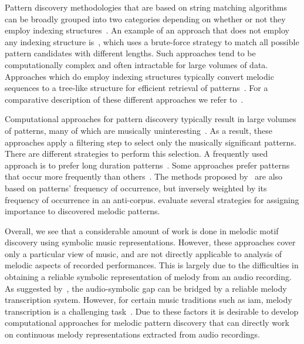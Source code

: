 Pattern discovery methodologies that are based on string matching algorithms can be broadly grouped into two categories depending on whether or not they employ indexing structures~\citep{Janssen2013}. An example of an approach that does not employ any indexing structure is~\cite{nieto2012perceptual}, which uses a brute-force strategy to match all possible pattern candidates with different lengths. Such approaches tend to be computationally complex and often intractable for large volumes of data. Approaches which do employ indexing structures typically convert melodic sequences to a tree-like structure for efficient retrieval of patterns~\citep{Knopke2009,conklin2011comparative}. For a comparative description of these different approaches we refer to~\cite{Janssen2013,meredith2002algorithms}.

Computational approaches for pattern discovery typically result in large volumes of patterns, many of which are musically uninteresting~\citep{marsden2012counselling,conklin2010discovery}. As a result, these approaches apply a filtering step to select only the musically significant patterns. There are different strategies to perform this selection. A frequently used approach is to prefer long duration patterns~\citep{Cambouropoulos2006,Karydis2006}. Some approaches prefer patterns that occur more frequently than others~\citep{Cambouropoulos2006,meredith2002algorithms}. The methods proposed by~\cite{conklin2010discovery,conklin2011comparative} are also based on patterns' frequency of occurrence, but inversely weighted by its frequency of occurrence in an anti-corpus. \cite{collins2011modeling} evaluate several strategies for assigning importance to discovered melodic patterns.

Overall, we see that a considerable amount of work is done in melodic motif discovery using symbolic music representations. However, these approaches cover only a particular view of music, and are not directly applicable to analysis of melodic aspects of recorded performances. This is largely due to the difficulties in obtaining a reliable symbolic representation of melody from an audio recording. As suggested by~\cite{collins2014bridging}, the audio-symbolic gap can be bridged by a reliable melody transcription system. However, for certain music traditions such as \gls{iam}, melody transcription is a challenging task~\citep{widdess1994involving}. Due to these factors it is desirable to develop computational approaches for melodic pattern discovery that can directly work on continuous melody representations extracted from audio recordings.


